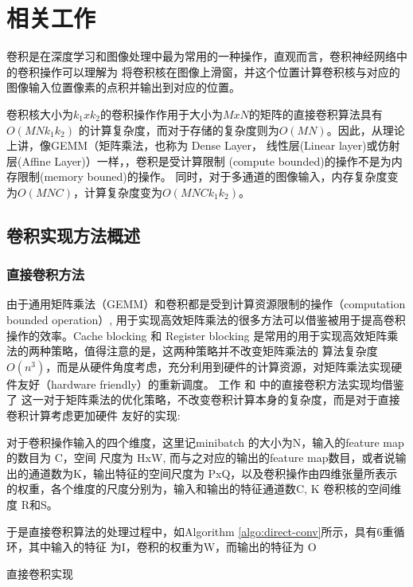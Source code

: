 
\chapter{相关工作}

卷积是在深度学习和图像处理中最为常用的一种操作，直观而言，卷积神经网络中的卷积操作可以理解为
将卷积核在图像上滑窗，并这个位置计算卷积核与对应的图像输入位置像素的点积并输出到对应的位置。

卷积核大小为$k_1xk_2$的卷积操作作用于大小为$MxN$的矩阵的直接卷积算法具有$O(MNk_1k_2)$
的计算复杂度，而对于存储的复杂度则为$O(MN)$。因此，从理论上讲，像GEMM（矩阵乘法，也称为
Dense Layer， 线性层(Linear layer)或仿射层(Affine Layer)）一样，，卷积是受计算限制
(compute bounded)的操作不是为内存限制(memory bouned)的操作。
同时，对于多通道的图像输入，内存复杂度变为$O(MNC)$，计算复杂度变为$O(MNCk_1k_2)$。


\section{卷积实现方法概述}

\subsection{直接卷积方法}

由于通用矩阵乘法（GEMM）和卷积都是受到计算资源限制的操作（computation bounded operation）,
用于实现高效矩阵乘法的很多方法可以借鉴被用于提高卷积操作的效率。Cache blocking 和 Register
blocking 是常用的用于实现高效矩阵乘法的两种策略，值得注意的是，这两种策略并不改变矩阵乘法的
算法复杂度$O(n^3)$，而是从硬件角度考虑，充分利用到硬件的计算资源，对矩阵乘法实现硬件友好（hardware
friendly）的重新调度。 工作
\cite{Georganas2018AnatomyOH} 和
\cite{Zhang2018HighPZ}
中的直接卷积方法实现均借鉴了
这一对于矩阵乘法的优化策略，不改变卷积计算本身的复杂度，而是对于直接卷积计算考虑更加硬件
友好的实现:

对于卷积操作输入的四个维度，这里记minibatch 的大小为N，输入的feature map的数目为 C，空间
尺度为 HxW, 而与之对应的输出的feature map数目，或者说输出的通道数为K，输出特征的空间尺度为
PxQ，以及卷积操作由四维张量所表示的权重，各个维度的尺度分别为，输入和输出的特征通道数C, K 
卷积核的空间维度 R和S。

于是直接卷积算法的处理过程中，如Algorithm \ref{algo:direct-conv}所示，具有6重循环，其中输入的特征
为I，卷积的权重为W，而输出的特征为 O 

\begin{algorithm}
  \caption{直接卷积实现}
  \label{algo:direct-conv}
\end{algorithm}

